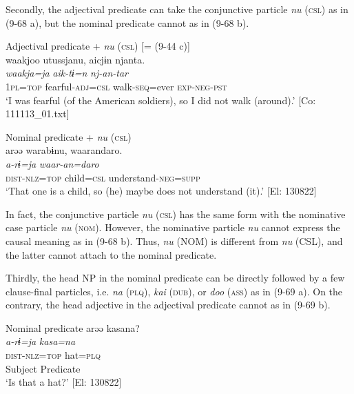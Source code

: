 Secondly, the adjectival predicate can take the conjunctive particle \textit{nu} (\textsc{csl}) as in (9-68 a), but the nominal predicate cannot as in (9-68 b).

\ea   \label{ex:9.68}
\ea Adjectival predicate + \textit{nu} (\textsc{csl}) [= (9-44 c)]\\
 \glll  waakjoo  utussjanu,  aicjɨn  njanta.\\
    \textit{waakja=ja}  \textit{}  \textit{aik-tɨ=n}  \textit{nj-an-tar}\\
    1\textsc{pl}=\textsc{top}  fearful-\textsc{adj}=\textsc{csl}  walk-\textsc{seq}=ever  \textsc{exp}-\textsc{neg}-\textsc{pst}\\
    \glt     ‘I was fearful (of the American soldiers), so I did not walk (around).’ [Co: 111113\_01.txt]

\ex Nominal predicate + \textit{nu} (\textsc{csl})\\
 \glll  *arəə  warabɨnu,  waarandaro.\\
    \textit{a-rɨ=ja}  \textit{}  \textit{waar-an=daro}\\
    \textsc{dist}-\textsc{nlz}=\textsc{top}  child=\textsc{csl}  understand-\textsc{neg}=\textsc{supp}\\
     ‘That one is a child, so (he) maybe does not understand (it).’ [El: 130822]
    \z
\z

In fact, the conjunctive particle \textit{nu} (\textsc{csl}) has the same form with the nominative case particle \textit{nu} (\textsc{nom}). However, the nominative particle \textit{nu} cannot express the causal meaning as in (9-68 b). Thus, \textit{nu} (NOM) is different from \textit{nu} (CSL), and the latter cannot attach to the nominal predicate.

Thirdly, the head NP in the nominal predicate can be directly followed by a few clause-final particles, i.e. \textit{na} (\textsc{plq}), \textit{kai} (\textsc{dub}), or \textit{doo} (\textsc{ass}) as in (9-69 a). On the contrary, the head adjective in the adjectival predicate cannot as in (9-69 b).

\ea \label{ex:9.69} Nominal predicate 
\ea %
 \gllll  arəə  kasana?\\
      \textit{a-rɨ=ja}  \textit{kasa=na}\\
      \textsc{dist}-\textsc{nlz}=\textsc{top}  hat=\textsc{plq}\\
      Subject  Predicate\\
      \glt       ‘Is that a hat?’ [El: 130822]

